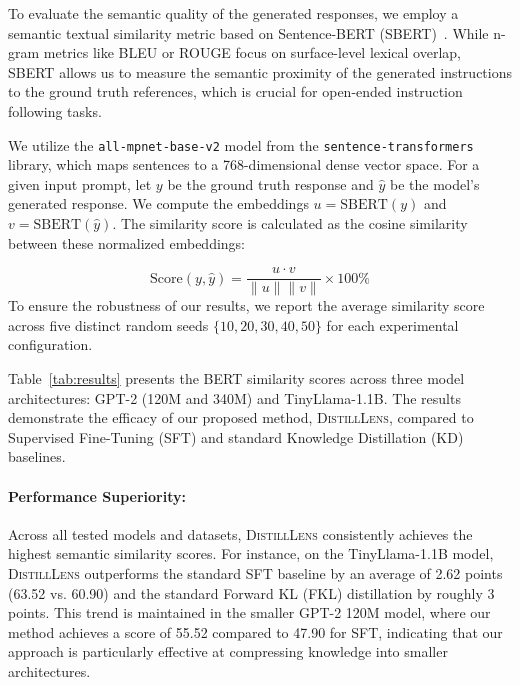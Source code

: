 \documentclass{article}
\theoremstyle{plain}
\theoremstyle{definition}
\theoremstyle{remark}
\begin{document}
To evaluate the semantic quality of the generated responses, we employ a semantic textual similarity metric based on Sentence-BERT (SBERT)~\cite{reimers2019sentence}. While n-gram metrics like BLEU or ROUGE focus on surface-level lexical overlap, SBERT allows us to measure the semantic proximity of the generated instructions to the ground truth references, which is crucial for open-ended instruction following tasks.

We utilize the \texttt{all-mpnet-base-v2} model from the \texttt{sentence-transformers} library, which maps sentences to a 768-dimensional dense vector space. For a given input prompt, let $y$ be the ground truth response and $\hat{y}$ be the model's generated response. We compute the embeddings $u = \text{SBERT}(y)$ and $v = \text{SBERT}(\hat{y})$. The similarity score is calculated as the cosine similarity between these normalized embeddings:

\begin{equation}
    \text{Score}(y, \hat{y}) = \frac{u \cdot v}{\|u\| \|v\|} \times 100 \%
\end{equation}
To ensure the robustness of our results, we report the average similarity score across five distinct random seeds $\{10, 20, 30, 40, 50\}$ for each experimental configuration.

Table~\ref{tab:results} presents the BERT similarity scores across three model architectures: GPT-2 (120M and 340M) and TinyLlama-1.1B. The results demonstrate the efficacy of our proposed method, \textsc{DistillLens}, compared to Supervised Fine-Tuning (SFT) and standard Knowledge Distillation (KD) baselines.

\paragraph{Performance Superiority:} 
Across all tested models and datasets, \textsc{DistillLens} consistently achieves the highest semantic similarity scores. For instance, on the TinyLlama-1.1B model, \textsc{DistillLens} outperforms the standard SFT baseline by an average of 2.62 points (63.52 vs. 60.90) and the standard Forward KL (FKL) distillation by roughly 3 points. This trend is maintained in the smaller GPT-2 120M model, where our method achieves a score of 55.52 compared to 47.90 for SFT, indicating that our approach is particularly effective at compressing knowledge into smaller architectures.
\end{document}
